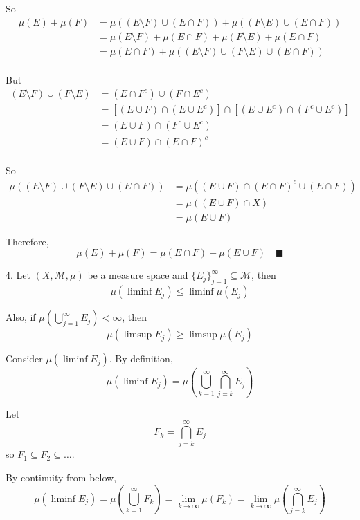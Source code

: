 \documentclass[12pt]{article}
\newcommand{\qed}{\quad \blacksquare}
\newcommand{\sub}{\subseteq}
\newcommand{\M}{\mathcal{M}}
\begin{document}
        So 
        \begin{align*}
            \mu(E) + \mu(F) &= \mu((E \setminus F) \cup (E \cap F)) + \mu((F \setminus E) \cup (E \cap F))\\
            &= \mu(E \setminus F) + \mu(E \cap F) + \mu(F \setminus E) + \mu(E \cap F)\\
            &= \mu(E \cap F) + \mu((E \setminus F) \cup (F \setminus E) \cup (E \cap F))\\
        \end{align*}

        But 
        \begin{align*}
            (E \setminus F) \cup (F \setminus E) &= (E \cap F^c) \cup (F \cap E^c)\\ 
                &= [(E \cup F) \cap (E \cup E^c)] \cap [(E \cup E^c) \cap (F^c \cup E^c)]\\
                &= (E \cup F) \cap (F^c \cup E^c)\\ 
                &= (E \cup F) \cap (E \cap F)^c\\
        \end{align*}

        So 
        \begin{align*}
            \mu((E \setminus F) \cup (F \setminus E) \cup (E \cap F)) &= \mu((E \cup F) \cap (E \cap F)^c \cup (E \cap F))\\ 
            &= \mu((E \cup F) \cap X)\\ 
            &= \mu(E \cup F)            
        \end{align*}

        Therefore, 
        \[\mu(E) + \mu(F) = \mu(E \cap F) + \mu(E \cup F) \qed\]
    \color{black}

\pagebreak

4. Let $(X, \M, \mu)$ be a measure space and $\{E_j\}_{j=1}^{\infty} \sub \M$, then 
\[\mu(\liminf E_j) \leq \liminf \mu(E_j)\]

Also, if $\mu(\bigcup_{j=1}^{\infty} E_j) < \infty$, then
\[ \mu(\limsup E_j) \geq \limsup \mu(E_j)\]

    \color{blue}
        Consider $\mu(\liminf E_j)$. By definition,
        \[\mu(\liminf E_j) = \mu\left(\bigcup_{k=1}^\infty \bigcap_{j=k}^{\infty} E_j\right)\]

        Let 
        \[F_k = \bigcap_{j=k}^{\infty} E_j\]
        so $F_1 \sub F_2 \sub \dots$. 

        By continuity from below, 
        \[\mu(\liminf E_j) = \mu\left(\bigcup_{k=1}^\infty F_k\right) = \lim_{k \to \infty} \mu(F_k) = \lim_{k\to \infty} \mu\left(\bigcap_{j = k}^{\infty} E_j\right) \]
\end{document}
